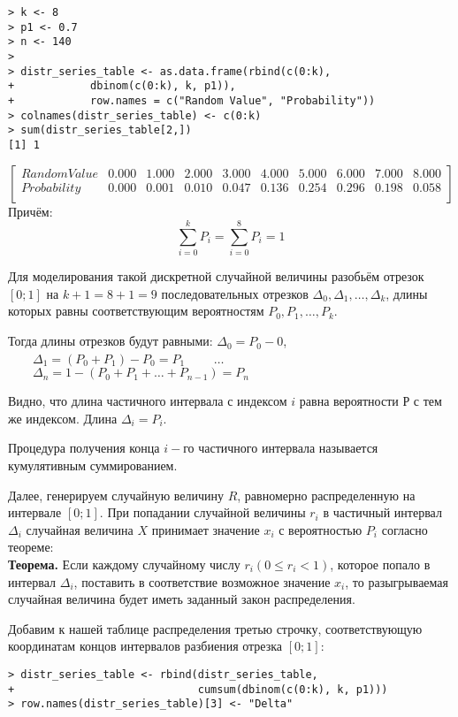\documentclass[14pt,a4paper]{scrartcl}
\begin{document}
\begin{lstlisting}
> k <- 8
> p1 <- 0.7
> n <- 140
> 
> distr_series_table <- as.data.frame(rbind(c(0:k),
+            dbinom(c(0:k), k, p1)), 
+            row.names = c("Random Value", "Probability"))
> colnames(distr_series_table) <- c(0:k)
> sum(distr_series_table[2,])
[1] 1
\end{lstlisting}

\begin{equation*}
	\begin{bmatrix}{}
	Random Value & 0.000 & 1.000 & 2.000 & 3.000 & 4.000 & 5.000 & 6.000 & 7.000 & 8.000 \\ 
	Probability & 0.000 & 0.001 & 0.010 & 0.047 & 0.136 & 0.254 & 0.296 & 0.198 & 0.058 \\ 
	\end{bmatrix}
\end{equation*}
Причём:
\begin{equation*}
	\sum_{i = 0}^{k}P_i = \sum_{i = 0}^{8}P_i = 1
\end{equation*}

Для моделирования такой дискретной случайной величины разобьём отрезок $[0;1]$ на $k+1 = 8 + 1 = 9$ последовательных отрезков $\Delta_0, \Delta_1, \dots, \Delta_{k}$, длины которых равны соответствующим вероятностям $P_0, P_1, \dots, P_{k}$.

Тогда длины отрезков будут равными: $\Delta_0 = P_0 - 0$, $\qquad \Delta_1 = (P_0 + P_1) - P_0 = P_1$ $\qquad \dots$$\qquad \Delta_n = 1 - (P_0 + P_1 + \dots + P_{n-1}) = P_n$

Видно, что длина частичного интервала с индексом $i$ равна вероятности $Р$ с тем же индексом. Длина $\Delta_i = P_i$.

Процедура получения конца $i-$го частичного интервала называется кумулятивным суммированием.

Далее, генерируем случайную величину $R$, равномерно распределенную на интервале $[0;1]$. При попадании случайной величины $r_i$ в частичный интервал $\Delta_i$ случайная величина $X$ принимает значение $x_i$ с вероятностью $P_i$ согласно теореме:\\
\textbf{Теорема.} Если каждому случайному числу $r_i(0\leq r_i < 1)$, которое попало в интервал $\Delta_i$, поставить в соответствие возможное значение $x_i$, то разыгрываемая случайная величина будет иметь заданный закон распределения.

Добавим к нашей таблице распределения третью строчку, соответствующую координатам концов интервалов разбиения отрезка $[0;1]$:
\begin{lstlisting}
> distr_series_table <- rbind(distr_series_table,
+                             cumsum(dbinom(c(0:k), k, p1)))
> row.names(distr_series_table)[3] <- "Delta"
\end{lstlisting}
\end{document}
